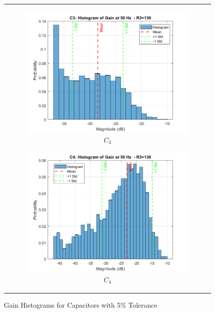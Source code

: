 \documentclass[hidelinks,12pt]{article}
\begin{document}
\begin{figure}[!h]
{\begin{tabular}{c}
				\begin{subfigure}[h]{0.4\textwidth}
					\centering
					\includegraphics[width=\textwidth]{figures/r3=130/c3.png}
					\caption{$C_3$}
				\end{subfigure}
				\hfill
				\begin{subfigure}[h]{0.4\textwidth}
					\centering
					\includegraphics[width=\textwidth]{figures/r3=130/c4.png}
					\caption{$C_4$}
				\end{subfigure}
			\end{tabular}
		}
		\caption{Gain Histograms for Capacitors with 5\% Tolerance}
	\end{figure}
	
	
	
\end{document}
